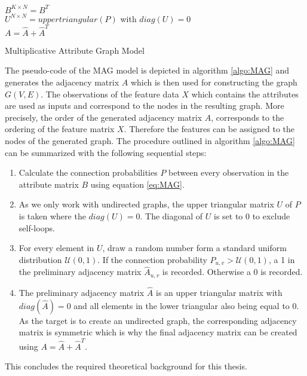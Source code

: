 	\begin{algorithm}[h]
		\scriptsize
		\SetAlgoLined
		\nl $B^{K \times N} = B^{T}$ \\
		\nl {}
		\nl $U^{N \times N} = uppertriangular(P)$ with $diag(U)=0$\\
		\nl {}
		\nl $A = \hat A + \hat A^{T}$
		\caption{Multiplicative Attribute Graph Model}
		\label{algo:MAG}
	\end{algorithm}

	\noindent The pseudo-code of the MAG model is depicted in algorithm 
	\ref{algo:MAG} and generates the adjacency matrix $A$ which is then used 
	for constructing the graph $G(V,E)$. The observations of the feature data 
	$X$ which contains the attributes are used as inputs and correspond to the 
	nodes in the resulting graph. More precisely, the order of the generated 
	adjacency matrix $A$, corresponds to the ordering of the feature matrix $X$. 
	Therefore the features can be assigned to the nodes of the generated graph. 
	The procedure outlined in algorithm \ref{algo:MAG} can be summarized with 
	the following sequential steps:

	\begin{enumerate}
		\item Calculate the connection probabilities $P$ between every 
			observation in the attribute matrix $B$ using equation \ref{eq:MAG}. 
		\item As we only work with undirected graphs, the upper triangular
			matrix $U$ of $P$ is taken where the $diag(U) = 0$. The diagonal of
			$U$ is set to 0 to exclude self-loops.
		\item For every element in $U$, draw a random number form a standard
			uniform distribution $\mathcal{U}(0,1)$. If the connection
			probability $P_{u,v}>\mathcal{U}(0,1)$, a 1 in the
			preliminary adjacency matrix $\hat A_{u,v}$ is recorded.
			Otherwise a 0 is recorded.
		\item The preliminary adjacency matrix $\hat A$ is an upper triangular
			matrix with $diag(\hat A) = 0$ and all elements in the lower
			triangular also being equal to 0. As the target is to create an
			undirected graph, the corresponding adjacency matrix is symmetric
			which is why the final adjacency matrix can be created using 
			$A = \hat A + \hat A^{T}$. 
	\end{enumerate}

	\noindent This concludes the required theoretical background for this
	thesis. 
